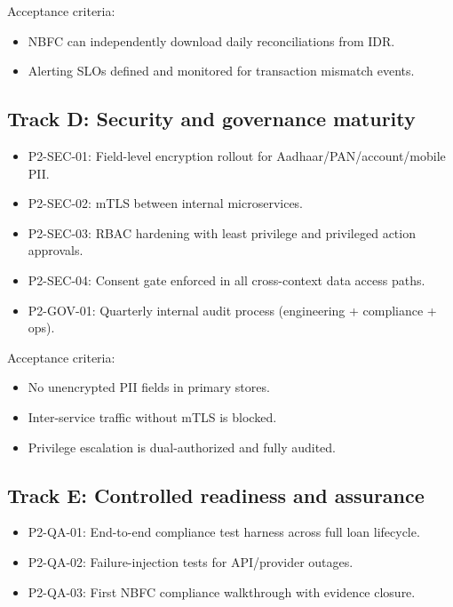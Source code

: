 ﻿\documentclass[12pt]{article}
\begin{document}
Acceptance criteria:

\begin{itemize}
\item NBFC can independently download daily reconciliations from IDR.
\item Alerting SLOs defined and monitored for transaction mismatch events.
\end{itemize}

\subsection{Track D: Security and governance maturity}


\begin{itemize}
\item P2-SEC-01: Field-level encryption rollout for Aadhaar/PAN/account/mobile PII.
\item P2-SEC-02: mTLS between internal microservices.
\item P2-SEC-03: RBAC hardening with least privilege and privileged action approvals.
\item P2-SEC-04: Consent gate enforced in all cross-context data access paths.
\item P2-GOV-01: Quarterly internal audit process (engineering + compliance + ops).
\end{itemize}

Acceptance criteria:

\begin{itemize}
\item No unencrypted PII fields in primary stores.
\item Inter-service traffic without mTLS is blocked.
\item Privilege escalation is dual-authorized and fully audited.
\end{itemize}

\subsection{Track E: Controlled readiness and assurance}


\begin{itemize}
\item P2-QA-01: End-to-end compliance test harness across full loan lifecycle.
\item P2-QA-02: Failure-injection tests for API/provider outages.
\item P2-QA-03: First NBFC compliance walkthrough with evidence closure.
\end{itemize}
\end{document}
